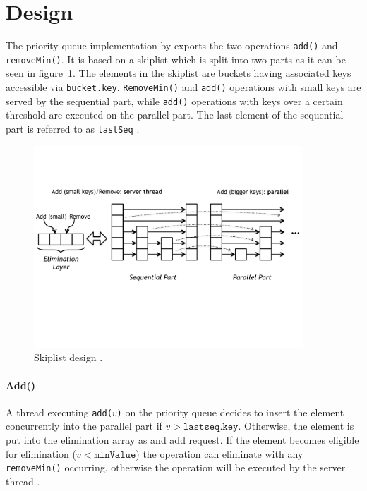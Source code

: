 
\section{Design}

The priority queue implementation by \citeauthor{calciu_adaptive_2014} exports the two operations \texttt{add()} and \texttt{removeMin()}. It is based on a skiplist which is split into two parts as it can be seen in figure~\ref{fig:pqe}. The elements in the skiplist are buckets having associated keys accessible via \texttt{bucket.key}. \texttt{RemoveMin()} and \texttt{add()} operations with small keys are served by the sequential part, while \texttt{add()} operations with keys over a certain threshold are executed on the parallel part. The last element of the sequential part is referred to as \texttt{lastSeq} \cite{calciu_adaptive_2014}.

\begin{figure}[htb]
	\centering
	\includegraphics[width=0.9\textwidth]{graphics/pqe.pdf}
	\caption{Skiplist design \cite{calciu_adaptive_2014}.}
	\label{fig:pqe}
\end{figure}

\paragraph{Add()}

A thread executing \texttt{add($v$)} on the priority queue decides to insert the element concurrently into the parallel part if $v > \texttt{lastseq.key}$. Otherwise, the element is put into the elimination array as and add request. If the element becomes eligible for elimination ($v < \texttt{minValue}$) the operation can eliminate with any \texttt{removeMin()} occurring, otherwise the operation will be executed by the server thread \cite{calciu_adaptive_2014}.

